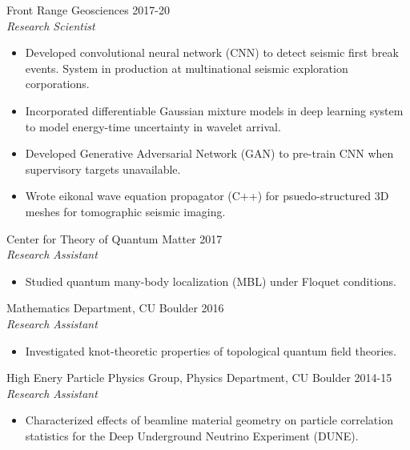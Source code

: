 \documentclass[margin]{res}
\begin{document}
\begin{resume}
 
               Front Range Geosciences \hfill            2017-20 \\
                 {\sl Research Scientist}
                 \begin{itemize}  \itemsep -2pt %
                 \item Developed convolutional neural network (CNN) to detect
                   seismic first break events. System in production at
                   multinational seismic exploration corporations.
                 \item Incorporated differentiable Gaussian mixture models in
                   deep learning system to model energy-time uncertainty in
                   wavelet arrival.
                 \item Developed Generative Adversarial Network (GAN) to pre-train
                   CNN when supervisory targets unavailable.
                 \item Wrote eikonal wave equation propagator (C++) for
                   psuedo-structured 3D meshes for tomographic seismic imaging.
                 \end{itemize} 
                 Center for Theory of Quantum Matter \hfill            2017 \\
		{\sl Research Assistant}
                 \begin{itemize}  \itemsep -2pt %
                 \item Studied quantum many-body localization (MBL) under Floquet conditions.
                 \end{itemize}

                Mathematics Department, CU Boulder \hfill            2016 \\
		 {\sl Research Assistant}
                 \begin{itemize}  \itemsep -2pt %
                 \item Investigated knot-theoretic properties of topological quantum field theories.
                 \end{itemize}

                High Enery Particle Physics Group, Physics Department, CU Boulder  \hfill            2014-15 \\
		{\sl Research Assistant}
                 \begin{itemize}  \itemsep -2pt %
                 \item Characterized effects of beamline material geometry on particle
                   correlation statistics for the Deep Underground Neutrino Experiment
                   (DUNE).
                 \end{itemize}


\end{resume}
\end{document}
